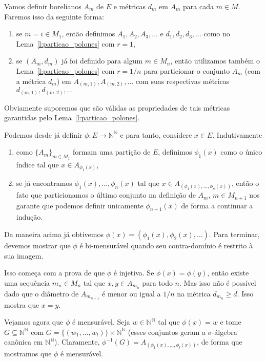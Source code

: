   Vamos definir borelianos $A_m$ de $E$ e métricas $d_m$ em $A_m$ para cada $m \in M$.
  Faremos isso da seguinte forma:
  \begin{enumerate}[\quad a)]
  \item se $m = i \in M_1$, então definimos $A_1, A_2, A_3, \dots$ e $d_1, d_2, d_3, \dots$ como no Lema~\ref{l:particao_polones} com $r = 1$,
  \item se $(A_m, d_m)$ já foi definido para algum $m \in M_n$, então utilizamos também o Lema~\ref{l:particao_polones} com $r = 1/n$ para particionar o conjunto $A_m$ (com a métrica $d_m$) em $A_{(m,1)}, A_{(m,2)}, \dots$ com suas respectivas métricas $d_{(m,1)}, d_{(m,2)}, \dots$
  \end{enumerate}
  Obviamente suporemos que são válidas as propriedades de tais métricas garantidas pelo Lema~\ref{l:particao_polones}.

  Podemos desde já definir $\phi:E \to \mathbb{N}^\mathbb{N}$ e para tanto, considere $x \in E$.
  Indutivamente
  \begin{enumerate}[\quad a)]
  \item como $\{A_m\}_{m \in M_1}$ formam uma partição de $E$, definimos $\phi_1(x)$ como o único índice tal que $x \in A_{\phi_1(x)}$,
  \item se já encontramos $\phi_1(x), \dots, \phi_n(x)$ tal que $x \in A_{(\phi_1(x), \dots, \phi_n(x))}$, então o fato que particionamos o último conjunto na definição de $A_m$, $m \in M_{n+1}$ nos garante que podemos definir unicamente $\phi_{n+1}(x)$ de forma a continuar a indução.
  \end{enumerate}
  Da maneira acima já obtivemos $\phi(x) = (\phi_1(x), \phi_2(x), \dots)$.
  Para terminar, devemos mostrar que $\phi$ é bi-mensurável quando seu contra-domínio é restrito à sua imagem.

  Isso começa com a prova de que $\phi$ é injetiva.
  Se $\phi(x) = \phi(y)$, então existe uma sequência $m_n \in M_n$ tal que $x, y \in A_{m_n}$ para todo $n$.
  Mas isso não é possível dado que o diâmetro de $A_{m_{n+1}}$ é menor ou igual a $1/n$ na métrica $d_{m_n} \geq d$.
  Isso mostra que $x = y$.

  Vejamos agora que $\phi$ é mensurável.
  Seja $w \in \mathbb{N}^\mathbb{N}$ tal que $\phi(x) = w$ e tome $G \subseteq \mathbb{N}^\mathbb{N}$ com $G = \{(w_1, \dots, w_l)\} \times \mathbb{N}^\mathbb{N}$ (esses conjuntos geram a $\sigma$-álgebra canônica em $\mathbb{N}^\mathbb{N}$).
  Claramente, $\phi^{-1}(G) = A_{(\phi_1(x), \dots, \phi_l(x))}$, de forma que mostramos que $\phi$ é mensurável.

